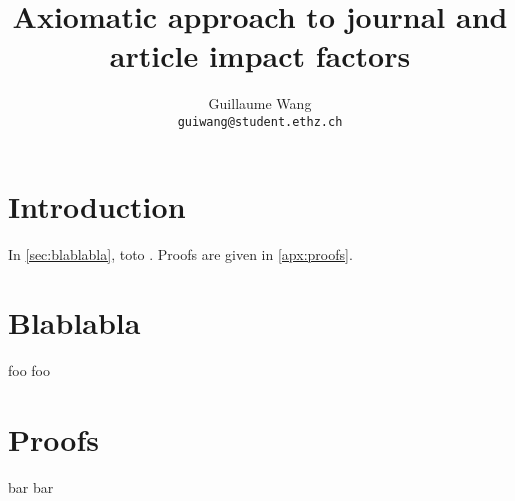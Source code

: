 \documentclass{article}
\title{Axiomatic approach to journal and article impact factors}
\date{}
\author{Guillaume Wang \\
{\scriptsize \texttt{guiwang@student.ethz.ch}}}
\numberwithin{definition}{section}
\numberwithin{theorem}{section}
\numberwithin{corollary}{section}
\numberwithin{proposition}{section}
\numberwithin{lemma}{section}
\numberwithin{claim}{section}
\numberwithin{fact}{section}
\numberwithin{remark}{section}
\numberwithin{example}{section}
\numberwithin{equation}{section}
\begin{document}
\maketitle

\section{Introduction} \label{sec:intro}
In \autoref{sec:blablabla}, toto \cite{kolmogorov_entropy_1959}. Proofs are given in \autoref{apx:proofs}.

\section{Blablabla} \label{sec:blablabla}
foo foo


\printbibliography
{} %

\newpage
\appendix

\section{Proofs} \label{apx:proofs}
bar bar
\end{document}
